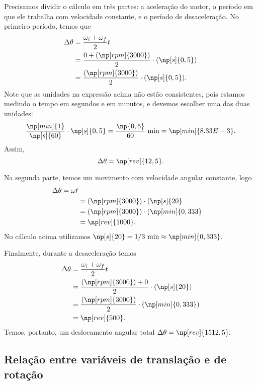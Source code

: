 Precisamos dividir o cálculo em três partes: a aceleração do motor, o período em que ele trabalha com velocidade constante, e o período de desaceleração. No primeiro período, temos que
\begin{align}
    \Delta \theta &= \frac{\omega_i + \omega_f}{2} t \\
    &= \frac{0 + (\np[rpm]{3000})}{2} \cdot(\np[s]{0,5}) \\
    &= \frac{(\np[rpm]{3000})}{2} \cdot(\np[s]{0,5}).
\end{align}
%
Note que as unidades na expressão acima não estão consistentes, pois estamos medindo o tempo em segundos e em minutos, e devemos escolher uma das duas unidades:
\begin{equation*}
    \frac{\np[min]{1}}{\np[s]{60}} \cdot \np[s]{0,5} = \frac{\np{0,5}}{60}~\textrm{min} = \np[min]{8.33E-3}.
\end{equation*}
%
Assim,
\begin{equation}
    \Delta \theta = \np[rev]{12,5}.
\end{equation}

Na segunda parte, temos um movimento com velocidade angular constante, logo
\begin{align}
    \Delta \theta = \omega t \\
    &= (\np[rpm]{3000})\cdot(\np[s]{20} \\
    &= (\np[rpm]{3000})\cdot(\np[min]{0,333} \\
    &= \np[rev]{1000}.
\end{align}
%
No cálculo acima utilizamos $\np[s]{20} = 1/3~\textrm{min} \approx \np[min]{0,333}.$

Finalmente, durante a desaceleração temos
\begin{align}
    \Delta \theta &= \frac{\omega_i + \omega_f}{2} t \\
    &= \frac{(\np[rpm]{3000}) + 0}{2} \cdot(\np[s]{20}) \\
    &= \frac{(\np[rpm]{3000})}{2} \cdot(\np[min]{0,333}) \\
    &= \np[rev]{500}.
\end{align}
%
Temos, portanto, um deslocamento angular total $\Delta \theta = \np[rev]{1512,5}.$

\subsection{Relação entre variáveis de translação e de rotação}

